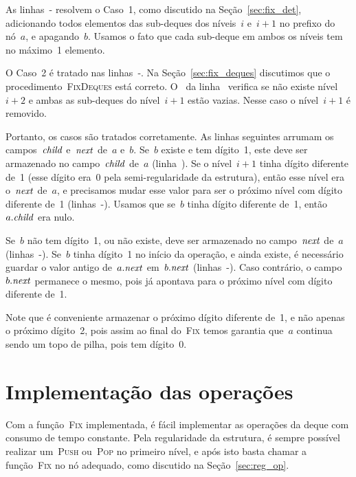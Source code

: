 \documentclass[main.tex]{subfiles}
\begin{document}
As linhas~{-} resolvem o Caso~1, como discutido na Seção~\ref{sec:fix_det}, adicionando todos elementos das sub-deques dos níveis~$i$ e~$i+1$ no prefixo do nó~$a$, e apagando~$b$. Usamos o fato que cada sub-deque em ambos os níveis tem no máximo~1 elemento.

O Caso~2 é tratado nas linhas~{-}. Na Seção~\ref{sec:fix_deques} discutimos que o procedimento~\textsc{FixDeques} está correto. O~ da linha~ verifica se não existe nível~$i+2$ e ambas as sub-deques do nível~$i+1$ estão vazias. Nesse caso o nível~$i+1$ é removido.

Portanto, os casos são tratados corretamente. As linhas seguintes arrumam os campos~$\mathit{child}$ e~$\mathit{next}$ de~$a$ e~$b$. Se~$b$ existe e tem dígito~1, este deve ser armazenado no campo~$\mathit{child}$ de~$a$ (linha~). Se o nível~$i+1$ tinha dígito diferente de~1 (esse dígito era~0 pela semi-regularidade da estrutura), então esse nível era o~$\mathit{next}$ de~$a$, e precisamos mudar esse valor para ser o próximo nível com dígito diferente de~1 (linhas~-). Usamos que se~$b$ tinha dígito diferente de~1, então~$a.\mathit{child}$ era nulo.

Se~$b$ não tem dígito~1, ou não existe, deve ser armazenado no campo~$\mathit{next}$ de~$a$ (linhas~-).
Se~$b$ tinha dígito~1 no início da operação, e ainda existe, é necessário guardar o valor antigo de~$a.\mathit{next}$ em~$b.\mathit{next}$ (linhas~-). Caso contrário, o campo~$b.\mathit{next}$ permanece o mesmo, pois já apontava para o próximo nível com dígito diferente de~1.

Note que é conveniente armazenar o próximo dígito diferente de~1, e não apenas o próximo dígito~2, pois assim ao final do~\textsc{Fix} temos garantia que~$a$ continua sendo um topo de pilha, pois tem dígito~0.

\section{Implementação das operações}

Com a função~\textsc{Fix} implementada, é fácil implementar as operações da deque com consumo de tempo constante. Pela regularidade da estrutura, é sempre possível realizar um~\textsc{Push} ou~\textsc{Pop} no primeiro nível, e após isto basta chamar a função~\textsc{Fix} no nó adequado, como discutido na Seção~\ref{sec:reg_op}.
\end{document}
